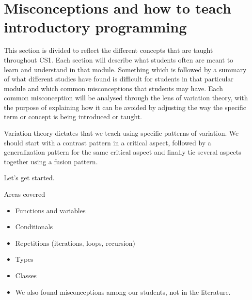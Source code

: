 \mode*
\section[Misconceptions and teaching]
  {Misconceptions and how to teach introductory programming}
\label{misconceptions}

This section is divided to reflect the different concepts that are taught 
throughout CS1. Each section will describe what students often are meant to 
learn and understand in that module. Something which is followed by a 
summary 
of what different studies have found is difficult for students in that 
particular
module and which common misconceptions that students may have. Each common 
misconception will be analysed through the lens of variation theory, with 
the purpose of explaining how it can be avoided by adjusting the way 
the specific term or concept is being introduced or taught.

Variation theory dictates that we teach using specific patterns of variation.
We should start with a contrast pattern in a critical aspect, followed by a 
generalization pattern for the same critical aspect and finally tie several 
aspects together using a fusion pattern.

Let's get started.

\begin{frame}
  \begin{block}{Areas covered}
    \begin{itemize}
      \item \alert<3>{Functions and variables}
      \item Conditionals
      \item Repetitions (iterations, loops, recursion)
      \item Types
      \item Classes
    \end{itemize}
  \end{block}

  \pause

  \begin{remark}
    \begin{itemize}
      \item We also found misconceptions among our students, not in the 
        literature.
    \end{itemize}
  \end{remark}
\end{frame}
